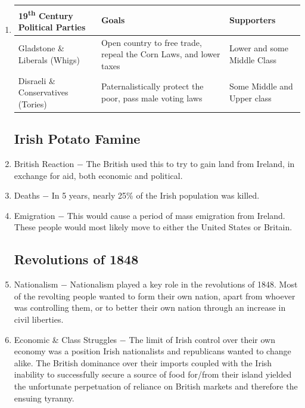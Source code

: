 \documentclass[12pt]{article}
\begin{document}
\begin{enumerate}
\item \begin{tabular}{p{} p{} p{}}
\hline
19\textsuperscript{th} Century Political Parties & Goals & Supporters \\
\hline
Gladstone \& Liberals (Whigs) & Open country to free trade, repeal the Corn Laws, and lower taxes & Lower and some Middle Class  \\
\hline
Disraeli \& Conservatives (Tories) & Paternalistically protect the poor, pass male voting laws & Some Middle and Upper class \\
\hline
\end{tabular}

\subsection{Irish Potato Famine}

\item British Reaction $-$ The British used this to try to gain land from Ireland, in exchange for aid, both economic and political. 

\item Deaths $-$ In 5 years, nearly 25\% of the Irish population was killed.

\item Emigration $-$ This would cause a period of mass emigration from Ireland. These people would most likely move to either the United States or Britain.

\subsection{Revolutions of 1848}

\item Nationalism $-$ Nationalism played a key role in the revolutions of 1848. Most of the revolting people wanted to form their own nation, apart from whoever was controlling them, or to better their own nation through an increase in civil liberties. 

\item Economic \& Class Struggles $-$ The limit of Irish control over their own economy was a position Irish nationalists and republicans wanted to change alike. The British dominance over their imports coupled with the Irish inability to successfully secure a source of food for/from their island yielded the unfortunate perpetuation of reliance on British markets and therefore the ensuing tyranny.


\end{enumerate}
\end{document}
